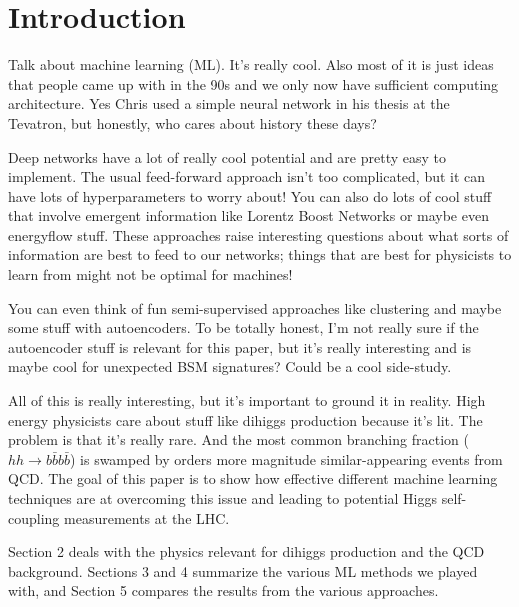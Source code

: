 \section{Introduction}
\label{sec:intro}

Talk about machine learning (ML). It's really cool. Also most of it is just ideas that people came up with in the 90s and we only now have sufficient computing architecture. Yes Chris used a simple neural network in his thesis at the Tevatron, but honestly, who cares about history these days?

Deep networks have a lot of really cool potential and are pretty easy to implement. The usual feed-forward approach isn't too complicated, but it can have lots of hyperparameters to worry about! You can also do lots of cool stuff that involve emergent information like Lorentz Boost Networks or maybe even energyflow stuff. These approaches raise interesting questions about what sorts of information are best to feed to our networks; things that are best for physicists to learn from might not be optimal for machines!

You can even think of fun semi-supervised approaches like clustering and maybe some stuff with autoencoders. To be totally honest, I'm not really sure if the autoencoder stuff is relevant for this paper, but it's really interesting and is maybe cool for unexpected BSM signatures? Could be a cool side-study.

All of this is really interesting, but it's important to ground it in reality. High energy physicists care about stuff like dihiggs production because it's lit. The problem is that it's really rare. And the most common branching fraction ($hh\rightarrow b\bar{b}b\bar{b}$) is swamped by orders more magnitude similar-appearing events from QCD. The goal of this paper is to show how effective different machine learning techniques are at overcoming this issue and leading to potential Higgs self-coupling measurements at the LHC.

Section 2 deals with the physics relevant for dihiggs production and the QCD background. Sections 3 and 4 summarize the various ML methods we played with, and Section 5 compares the results from the various approaches.
